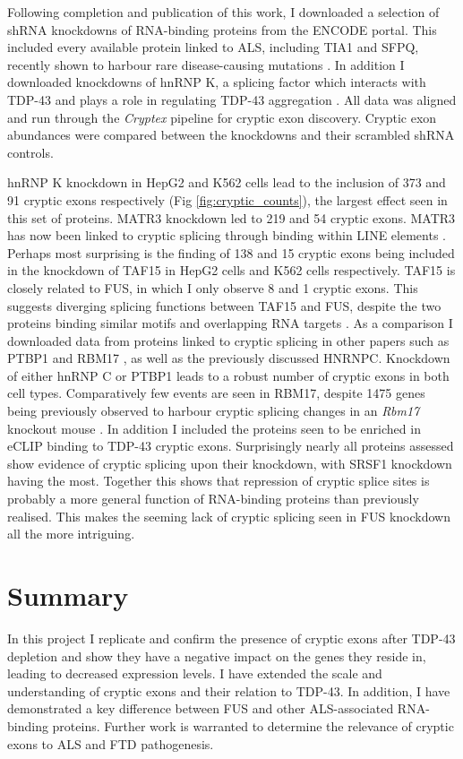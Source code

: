 Following completion and publication of this work, I downloaded a selection of shRNA knockdowns of RNA-binding proteins from the ENCODE portal. 
This included every available protein linked to ALS, including TIA1 and SFPQ, recently shown to harbour rare disease-causing mutations \citep{Mackenzie2017,Thomas-Jinu2017}.
In addition I downloaded knockdowns of hnRNP K, a splicing factor which interacts with TDP-43 \citep{Freibaum2010-hw} and plays a role in regulating TDP-43 aggregation \citep{Moujalled2015}.
All data was aligned and run through the \textit{Cryptex} pipeline for cryptic exon discovery. Cryptic exon abundances were compared between the knockdowns and their scrambled shRNA controls.

hnRNP K knockdown in HepG2 and K562 cells lead to the inclusion of 373 and 91 cryptic exons respectively (Fig \ref{fig:cryptic_counts}), the largest effect seen in this set of proteins.
MATR3 knockdown led to 219 and 54 cryptic exons. MATR3 has now been linked to cryptic splicing through binding within LINE elements \citep{Attig2018}.
Perhaps most surprising is the finding of 138 and 15 cryptic exons being included in the knockdown of TAF15 in HepG2 cells and K562 cells respectively. 
TAF15 is closely related to FUS, in which I only observe 8 and 1 cryptic exons.
This suggests diverging splicing functions between TAF15 and FUS, despite the two proteins binding similar motifs and overlapping RNA targets \citep{Kapeli2016}.
As a comparison I downloaded data from proteins linked to cryptic splicing in other papers such as PTBP1 and RBM17 \citep{Ling2016, Tan2016}, as well as the previously discussed HNRNPC. 
Knockdown of either hnRNP C or PTBP1 leads to a robust number of cryptic exons in both cell types.
Comparatively few events are seen in RBM17, despite 1475 genes being previously observed to harbour cryptic splicing changes in an \textit{Rbm17} knockout mouse \citep{Tan2016}.
In addition I included the proteins seen to be enriched in eCLIP binding to TDP-43 cryptic exons.
Surprisingly nearly all proteins assessed show evidence of cryptic splicing upon their knockdown, with SRSF1 knockdown having the most.
Together this shows that repression of cryptic splice sites is probably a more general function of RNA-binding proteins than previously realised. 
This makes the seeming lack of cryptic splicing seen in FUS knockdown all the more intriguing.


\section{Summary}
In this project I replicate and confirm the presence of cryptic exons after TDP-43 depletion and show they have a negative impact on the genes they reside in, leading to decreased expression levels.  I have extended the scale and understanding of cryptic exons and their relation to TDP-43. In addition, I have demonstrated a key difference between FUS and other ALS-associated RNA-binding proteins. Further work is warranted to determine the relevance of cryptic exons to ALS and FTD pathogenesis.


